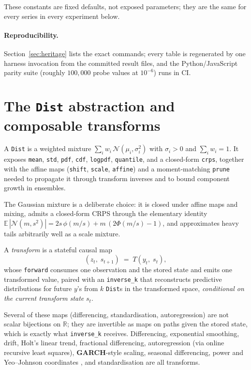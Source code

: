 \documentclass[article]{jss}
\providecommand{\proglang}[1]{\textsf{#1}}
\providecommand{\pkg}[1]{\textbf{#1}}
\providecommand{\code}[1]{\texttt{#1}}
\begin{document}
These constants are fixed defaults, not exposed parameters; they are
the same for every series in every experiment below.

\paragraph{Reproducibility.}
Section~\ref{sec:heritage} lists the exact commands; every table is regenerated
by one harness invocation from the committed result files, and the
\proglang{Python}/\proglang{JavaScript} parity suite (roughly $100{,}000$ probe
values at $10^{-6}$) runs in CI.

\section{The \code{Dist} abstraction and composable transforms} \label{sec:dist}

A \code{Dist} is a weighted mixture $\sum_i w_i\,\mathcal N(\mu_i,\sigma_i^2)$
with $\sigma_i>0$ and $\sum_i w_i = 1$. It exposes \code{mean}, \code{std},
\code{pdf}, \code{cdf}, \code{logpdf}, \code{quantile}, and a closed-form
\code{crps}, together with the affine maps (\code{shift}, \code{scale},
\code{affine}) and a moment-matching \code{prune} needed to propagate it through
transform inverses and to bound component growth in ensembles.

The Gaussian
mixture is a deliberate choice: it is closed under affine maps and mixing, admits
a closed-form CRPS through the elementary identity
$\mathbb{E}\,|\mathcal N(m,s^2)| = 2 s\,\phi(m/s) + m\,(2\Phi(m/s)-1)$, and
approximates heavy tails arbitrarily well as a scale mixture.

A \emph{transform} is a stateful causal map
\[
(z_t,\; s_{t+1}) \;=\; T(y_t,\; s_t),
\]
whose \code{forward} consumes one observation and the stored state and emits one
transformed value, paired with an \code{inverse\_k} that reconstructs predictive
distributions for future $y$'s from $k$ \code{Dist}s in the transformed space,
\emph{conditional on the current transform state} $s_t$.

Several of these maps
(differencing, standardisation, autoregression) are not scalar bijections on
$\mathbb R$; they are invertible as maps on paths given the stored state, which
is exactly what \code{inverse\_k} receives. Differencing, exponential smoothing,
drift, Holt's linear trend, fractional differencing, autoregression (via online
recursive least squares), \pkg{GARCH}-style scaling, seasonal differencing,
power and Yeo--Johnson coordinates \citep{box1964analysis,yeo2000new}, and
standardisation are all transforms.
\end{document}
